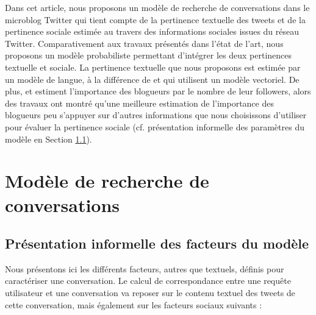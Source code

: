 \documentclass{article-hermes}
\begin{document}
\par Dans cet article, nous proposons un modèle de recherche de conversations dans le microblog Twitter qui tient compte de la pertinence textuelle des tweets et de la pertinence sociale estimée au travers des informations sociales issues du réseau Twitter. Comparativement aux travaux présentés dans l'état de l'art, nous proposons un modèle probabiliste permettant d'intégrer les deux pertinences textuelle et sociale. La pertinence textuelle que nous proposons est estimée par un modèle de langue, à la différence de \cite{magnani1} et \cite{magnani2} qui utilisent un modèle vectoriel. De plus, \cite{magnani1} et \cite{magnani2} estiment l'importance des blogueurs par le nombre de leur followers, alors des travaux ont montré qu'une meilleure estimation de l'importance des blogueurs peu s'appuyer sur d'autres informations que nous choisissons d'utiliser pour évaluer la pertinence sociale (cf. présentation informelle des paramètres du modèle en Section \ref{subsec:par}).







\section{Modèle de recherche de conversations}
\label{sec:modele}


\subsection{Présentation informelle des facteurs du modèle}
\label{subsec:par}
\par Nous présentons ici les différents facteurs, autres que textuels, définis pour caractériser une conversation. Le calcul de correspondance entre une requête utilisateur et une conversation va reposer sur le contenu textuel des tweets de cette conversation, mais également sur les facteurs sociaux suivants :
\end{document}
